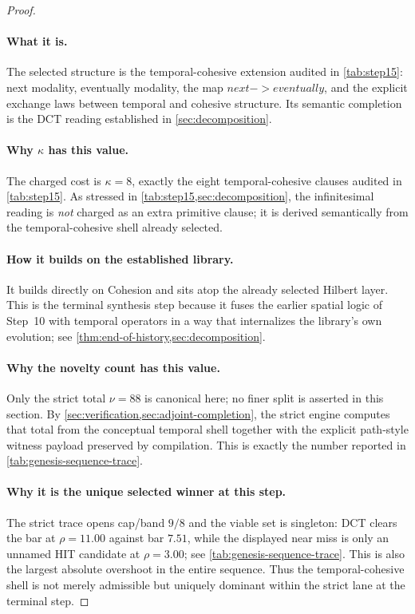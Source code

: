 \documentclass[11pt,a4paper]{article}
\def\to{->}%
\def\bigcirc{next}%
\def\Diamond{eventually}%
\theoremstyle{plain}
\theoremstyle{definition}
\theoremstyle{remark}
\begin{document}
\begin{proof}
\paragraph{What it is.}
The selected structure is the temporal-cohesive extension audited in
\cref{tab:step15}: next modality, eventually modality, the map
$\bigcirc\to\Diamond$, and the explicit exchange laws between temporal and
cohesive structure.
Its semantic completion is the DCT reading established in
\cref{sec:decomposition}.

\paragraph{Why $\kappa$ has this value.}
The charged cost is $\kappa=8$, exactly the eight temporal-cohesive clauses
audited in \cref{tab:step15}.
As stressed in \cref{tab:step15,sec:decomposition}, the infinitesimal reading is
\emph{not} charged as an extra primitive clause; it is derived semantically from
the temporal-cohesive shell already selected.

\paragraph{How it builds on the established library.}
It builds directly on Cohesion and sits atop the already selected Hilbert layer.
This is the terminal synthesis step because it fuses the earlier spatial logic
of Step~10 with temporal operators in a way that internalizes the library's own
evolution; see \cref{thm:end-of-history,sec:decomposition}.

\paragraph{Why the novelty count has this value.}
Only the strict total $\nu=88$ is canonical here; no finer split is asserted in
this section.
By \cref{sec:verification,sec:adjoint-completion}, the strict engine computes
that total from the conceptual temporal shell together with the explicit
path-style witness payload preserved by compilation.
This is exactly the number reported in \cref{tab:genesis-sequence-trace}.

\paragraph{Why it is the unique selected winner at this step.}
The strict trace opens cap/band $9/8$ and the viable set is singleton:
DCT clears the bar at $\rho=11.00$ against bar $7.51$, while the displayed near
miss is only an unnamed HIT candidate at $\rho=3.00$; see
\cref{tab:genesis-sequence-trace}.
This is also the largest absolute overshoot in the entire sequence.
Thus the temporal-cohesive shell is not merely admissible but uniquely dominant
within the strict lane at the terminal step.
\end{proof}
\end{document}
